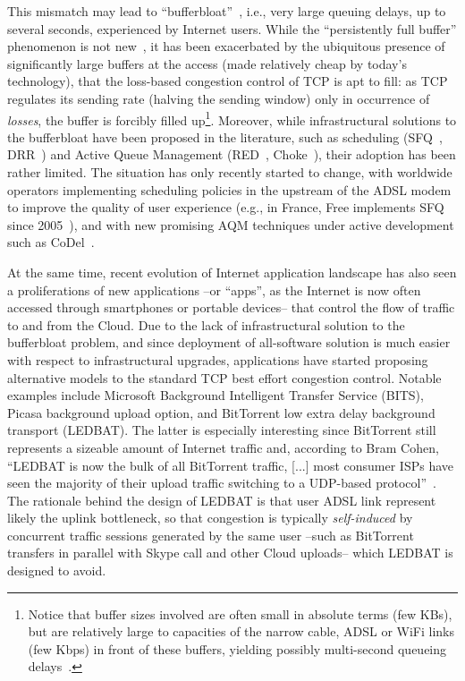 \documentclass[conference]{IEEEtran}
\begin{document}
This mismatch may lead to ``bufferbloat''~\cite{bufferbloat12cacm}, i.e., very large queuing delays, up to several seconds, experienced by Internet users. While the ``persistently full buffer'' phenomenon is not new~\cite{cheshire96rants}, it has been exacerbated by the ubiquitous presence of significantly large buffers at the access (made relatively cheap by today's technology), that the loss-based congestion control of TCP is apt to fill: as TCP regulates its sending rate  (halving the sending window)  only in occurrence of  \emph{losses}, the buffer is forcibly filled up\footnote{Notice that buffer sizes involved are often small in absolute terms (few KBs), but are relatively large to capacities of the narrow cable, ADSL or WiFi links (few Kbps) in front of these buffers, yielding possibly multi-second queueing delays~\cite{kreibich2010netalyzr}.}. Moreover, while infrastructural solutions to the bufferbloat have been proposed in the literature, such as scheduling (SFQ~\cite{sfq}, DRR~\cite{drr}) and Active Queue Management (RED~\cite{red},  Choke~\cite{choke}), their adoption has been rather limited. The situation has only recently started to change, with worldwide operators implementing scheduling policies in the upstream of the ADSL modem to improve the quality of user experience (e.g., in France, Free implements SFQ since 2005~\cite{free_sfq}), and with new promising AQM techniques under active development such as CoDel~\cite{codel}.

At the same time, recent evolution of Internet application landscape has also seen a proliferations of new applications --or ``apps'', as the Internet is now often accessed through smartphones or portable devices-- that control the flow of traffic to and from the Cloud.  Due to the lack of infrastructural solution to the bufferbloat problem, and since deployment of all-software solution is much easier with respect to infrastructural upgrades, applications have started proposing alternative models to the standard TCP best effort congestion control. Notable examples include Microsoft Background Intelligent Transfer Service (BITS), Picasa background upload option, and BitTorrent low extra delay background transport (LEDBAT)\cite{ledbat_draft}. The latter is especially interesting since BitTorrent still represents a sizeable amount of Internet traffic and, according to Bram Cohen, ``LEDBAT is now the bulk of all BitTorrent traffic, [...] most consumer ISPs have seen the majority of their upload traffic switching to a UDP-based protocol''~\cite{cohen_quora}. The rationale behind the design of LEDBAT is that user ADSL link represent likely the uplink bottleneck, so that congestion is typically \emph{self-induced} by concurrent traffic sessions generated by the same user --such as BitTorrent transfers in parallel with Skype call and other Cloud uploads-- which LEDBAT is designed to avoid. 
\end{document}
